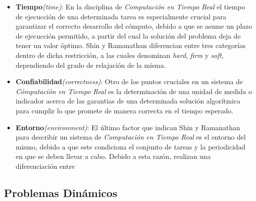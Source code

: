 \documentclass{subfiles}
\begin{document}
        \begin{itemize}

          \item \textbf{Tiempo}\emph{(time)}: En la disciplina de \emph{Computación en Tiempo Real} el tiempo de ejecucción de una determinada tarea es especialmente crucial para garantizar el correcto desarrollo del cómputo, debido a que se asume un plazo de ejecucción permitido, a partir del cual la solución del problema deja de tener un valor óptimo. Shin y Ramanathan\cite{259423} diferencian entre tres categorías dentro de dicha restricción, a las cuales denominan \emph{hard}, \emph{firm} y \emph{soft}, dependiendo del grado de relajación de la misma.

          \item \textbf{Confiabilidad}\emph{(correctness)}: Otro de los puntos cruciales en un sistema de \emph{Cómputación en Tiempo Real} es la determinación de una unidad de medida o indicador acerca de las garantias de una determinada solución algorítmica para cumplir lo que promete de manera correcta en el tiempo esperado.

          \item \textbf{Entorno}\emph{(environment)}: El último factor que indican Shin y Ramanathan\cite{259423} para describir un sistema de \emph{Computación en Tiempo Real} es el entorno del mismo, debido a que este condiciona el conjunto de tareas y la periodicidad en que se deben llevar a cabo. Debido a esta razón, realizan una diferenciación entre

        \end{itemize}

      \subsection{Problemas Dinámicos}
\end{document}
